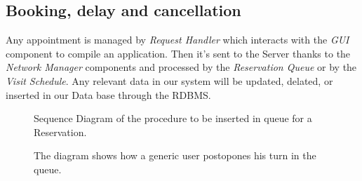 \subsection{Booking, delay and cancellation}

Any appointment is managed by \textit{Request Handler} which interacts with the \textit{GUI} component to compile an application. Then it's sent to the Server thanks to the \textit{Network Manager} components and processed by the \textit{Reservation Queue} or by the \textit{Visit Schedule}. Any relevant data in our system will be updated, delated, or inserted in our Data base through the RDBMS.


\begin{figure}[H]
  \label{ReservatioSD}
  \centering
    \caption{Sequence Diagram of the procedure to be inserted in queue for a Reservation.}
      \label{ReservatioSD}

\end{figure} 


\begin{figure}[H]
  \label{PostponeReservationSD}
  \centering
    \caption{The diagram shows how a generic user postopones his turn in the queue. }
\end{figure} 



